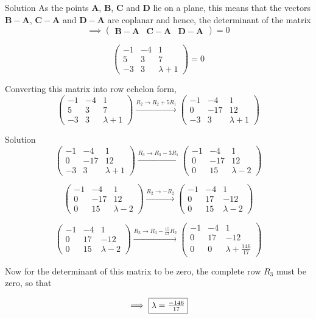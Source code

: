 \documentclass{beamer}
\let\vec\mathbf
\theoremstyle{remark}
\newcommand{\myvec}[1]{\ensuremath{\begin{pmatrix}#1\end{pmatrix}}}
\begin{document}
\begin{frame}{Solution}
As the points $\vec{A}$, $\vec{B}$, $\vec{C}$ and $\vec{D}$ lie on a plane, this means that the vectors $\vec{B} - \vec{A}$, $\vec{C} - \vec{A}$ and $\vec{D} - \vec{A}$ are coplanar and hence, the determinant of the matrix\\
\begin{equation}
\implies {\myvec{\vec{B} - \vec{A} & \vec{C} - \vec{A} & \vec{D} - \vec{A}}} = 0
\end{equation}

\begin{equation}
    {\myvec{-1 & -4 & 1\\5 & 3 &7\\-3 & 3 & \lambda+1}} = 0
\end{equation}

Converting this matrix into row echelon form,
\begin{equation}
 \myvec{-1 & -4 & 1\\5 & 3 &7\\-3 & 3 & \lambda+1} \overset{R_2 \rightarrow R_2 + 5R_1}{\longrightarrow} \myvec{-1 & -4 & 1\\0 & -17 & 12\\-3 & 3 & \lambda+1}
\end{equation}
\end{frame}

\begin{frame}{Solution}
\begin{equation}
    \myvec{-1 & -4 & 1\\0 & -17 & 12\\-3 & 3 & \lambda+1} \overset{R_3 \rightarrow R_3 - 3R_1}{\longrightarrow} \myvec{-1 & -4 & 1\\0 & -17 & 12\\0 & 15 & \lambda-2}
\end{equation}

\begin{equation}
    \myvec{-1 & -4 & 1\\0 & -17 & 12\\0 & 15 & \lambda-2} \overset{R_2 \rightarrow -R_2}{\longrightarrow} \myvec{-1 & -4 & 1\\0 & 17 & -12\\0 & 15 & \lambda-2}
\end{equation}

\begin{equation}
    \myvec{-1 & -4 & 1\\0 & 17 & -12\\0 & 15 & \lambda-2} \overset{R_3 \rightarrow R_3 - \frac{15}{17}R_2}{\longrightarrow} \myvec{-1 & -4 & 1\\0 & 17 & -12\\0 & 0 & \lambda+\frac{146}{17}}
\end{equation}

Now for the determinant of this matrix to be zero, the complete row $R_3$ must be zero, so that

\begin{equation}
    \implies \fbox{$\lambda = \frac{-146}{17}$}
\end{equation}
\end{frame}
\end{document}
